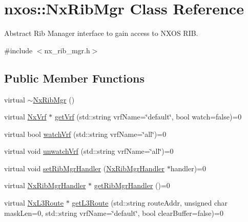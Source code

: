 \hypertarget{classnxos_1_1_nx_rib_mgr}{}\section{nxos\+:\+:Nx\+Rib\+Mgr Class Reference}
\label{classnxos_1_1_nx_rib_mgr}


Abstract Rib Manager interface to gain access to N\+X\+OS R\+IB.  




{\ttfamily \#include $<$nx\+\_\+rib\+\_\+mgr.\+h$>$}

\subsection*{Public Member Functions}
\begin{DoxyCompactItemize}
\item 
virtual \mbox{\hyperlink{classnxos_1_1_nx_rib_mgr_a5f390bcc244b9f5984d35290aea0e2cc}{$\sim$\+Nx\+Rib\+Mgr}} ()
\item 
virtual \mbox{\hyperlink{classnxos_1_1_nx_vrf}{Nx\+Vrf}} $\ast$ \mbox{\hyperlink{classnxos_1_1_nx_rib_mgr_a605323f1d764bc8c27fe770a9a6b4628}{get\+Vrf}} (std\+::string vrf\+Name=\char`\"{}default\char`\"{}, bool watch=false)=0
\item 
virtual bool \mbox{\hyperlink{classnxos_1_1_nx_rib_mgr_a35e2a52be337d47cd111803f64aca904}{watch\+Vrf}} (std\+::string vrf\+Name=\char`\"{}all\char`\"{})=0
\item 
virtual void \mbox{\hyperlink{classnxos_1_1_nx_rib_mgr_a957da78022cd4af95ee27941d0b67ce0}{unwatch\+Vrf}} (std\+::string vrf\+Name=\char`\"{}all\char`\"{})=0
\item 
virtual void \mbox{\hyperlink{classnxos_1_1_nx_rib_mgr_ac42dd29e34f9c508614733dbec518b99}{set\+Rib\+Mgr\+Handler}} (\mbox{\hyperlink{classnxos_1_1_nx_rib_mgr_handler}{Nx\+Rib\+Mgr\+Handler}} $\ast$handler)=0
\item 
virtual \mbox{\hyperlink{classnxos_1_1_nx_rib_mgr_handler}{Nx\+Rib\+Mgr\+Handler}} $\ast$ \mbox{\hyperlink{classnxos_1_1_nx_rib_mgr_aeed917ba912782303662c4009f3fcfcd}{get\+Rib\+Mgr\+Handler}} ()=0
\item 
virtual \mbox{\hyperlink{classnxos_1_1_nx_l3_route}{Nx\+L3\+Route}} $\ast$ \mbox{\hyperlink{classnxos_1_1_nx_rib_mgr_ae84cf1b9546fc3bf70e12bc7209ca190}{get\+L3\+Route}} (std\+::string route\+Addr, unsigned char mask\+Len=0, std\+::string vrf\+Name=\char`\"{}default\char`\"{}, bool clear\+Buffer=false)=0
\item 

\end{DoxyCompactItemize}
